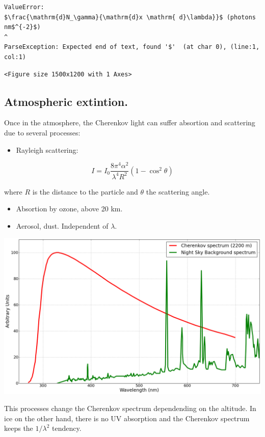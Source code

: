 \documentclass[
  letterpaper,
  DIV=11,
  numbers=noendperiod]{scrreprt}
\providecommand{\tightlist}{%
  \setlength{\itemsep}{0pt}\setlength{\parskip}{0pt}}\usepackage{longtable,booktabs,array}
\begin{document}
\begin{verbatim}
ValueError: 
$\frac{\mathrm{d}N_\gamma}{\mathrm{d}x \mathrm{ d}\lambda}}$ (photons nm$^{-2}$)
^
ParseException: Expected end of text, found '$'  (at char 0), (line:1, col:1)
\end{verbatim}

\begin{verbatim}
<Figure size 1500x1200 with 1 Axes>
\end{verbatim}

\subsection{Atmospheric extintion.}\label{atmospheric-extintion.}

Once in the atmosphere, the Cherenkov light can suffer absortion and
scattering due to several processes:

\begin{itemize}
\tightlist
\item
  Rayleigh scattering:
\end{itemize}

\[ I = I_0 \frac{8\pi^4 \alpha^2}{\lambda^4 R^2}(1 - \cos^2\theta)\]

where \(R\) is the distance to the particle and \(\theta\) the
scattering angle.

\begin{itemize}
\tightlist
\item
  Absortion by ozone, above 20 km.
\item
  Aerosol, dust. Independent of \(\lambda\).
\end{itemize}

\includegraphics{images/Cherenkov_NSB_spectra.png}

This processes change the Cherenkov spectrum dependending on the
altitude. In ice on the other hand, there is no UV absorption and the
Cherenkov spectrum keeps the \(1/\lambda^2\) tendency.
\end{document}
